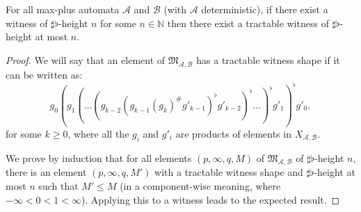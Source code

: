 \documentclass{lmcs}
\theoremstyle{remark}
\newcommand{\N}{\mathbb{N}}
\newcommand{\ideal}{\mathfrak{M}}
\newcommand{\autA}{\mathcal{A}}
\newcommand{\autB}{\mathcal{B}}
\theoremstyle{remark}
\begin{document}
\begin{prop}
\label{prop:witnesssfh}
For all max-plus automata $\autA$ and $\autB$ (with $\autA$ deterministic), if there exist a witness of $\sharp\flat$-height $n$ for some $n \in \N$ then there exist a tractable witness of $\sharp\flat$-height at most $n$.
\end{prop}

\begin{proof}
We will say that an element of $\ideal_{\autA,\autB}$ has a tractable witness shape if it can be written as:
\[g_0 (g_1 (\dots (g_{k-2} ( g_{k-1} (g_{k})^\#g'_{k-1})^\flat g'_{k-2})^\flat \dots)^\flat g'_{1})^\flat g'_{0},\] 
for some $k \geq 0$, where all the $g_i$ and $g'_i$ are products of elements in $X_{\autA,\autB}$.

We prove by induction that for all elements $(p,\infty,q,M)$ of $\ideal_{\autA,\autB}$ of $\sharp\flat$-height $n$, there is an element $(p,\infty,q,M')$ with a tractable witness shape and $\sharp\flat$-height at most $n$ such that $M' \leq M$ (in a component-wise meaning, where $-\infty<0<1<\infty$). Applying this to a witness leads to the expected result.


\end{proof}
\end{document}
